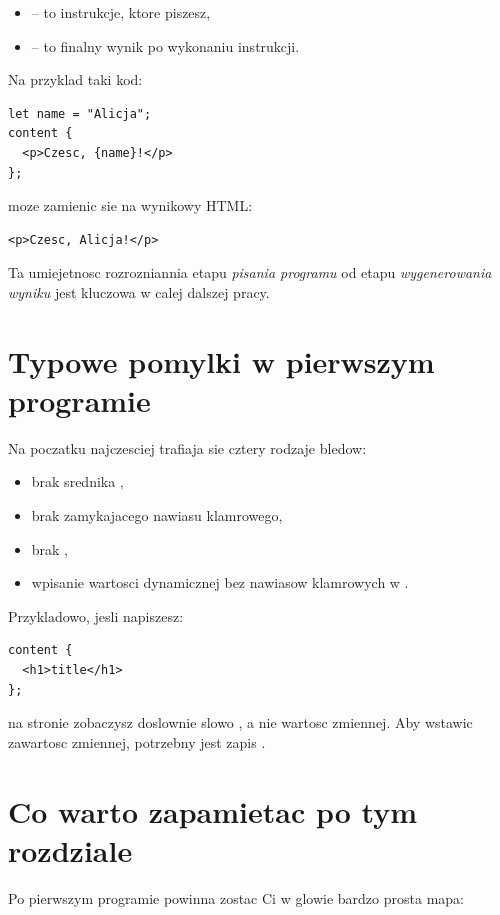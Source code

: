 \begin{itemize}
  \item {} -- to instrukcje, ktore piszesz,
  \item {} -- to finalny wynik po wykonaniu instrukcji.
\end{itemize}

Na przyklad taki kod:

\begin{lstlisting}[style=moonchunk,caption={Kod z interpolacja wartosci}]
let name = "Alicja";
content {
  <p>Czesc, {name}!</p>
};
\end{lstlisting}

moze zamienic sie na wynikowy HTML:

\begin{lstlisting}[style=basecode,caption={Przykladowy wynik po wykonaniu}]
<p>Czesc, Alicja!</p>
\end{lstlisting}

Ta umiejetnosc rozrozniannia etapu \emph{pisania programu} od etapu \emph{wygenerowania
wyniku} jest kluczowa w calej dalszej pracy.

\section{Typowe pomylki w pierwszym programie}
Na poczatku najczesciej trafiaja sie cztery rodzaje bledow:

\begin{itemize}
  \item brak srednika \mc{;},
  \item brak zamykajacego nawiasu klamrowego,
  \item brak ,
  \item wpisanie wartosci dynamicznej bez nawiasow klamrowych w .
\end{itemize}

Przykladowo, jesli napiszesz:

\begin{lstlisting}[style=moonchunk,caption={Zly zapis wartosci dynamicznej}]
content {
  <h1>title</h1>
};
\end{lstlisting}

na stronie zobaczysz doslownie slowo , a nie wartosc zmiennej. Aby wstawic
zawartosc zmiennej, potrzebny jest zapis .

\section{Co warto zapamietac po tym rozdziale}
Po pierwszym programie powinna zostac Ci w glowie bardzo prosta mapa:

